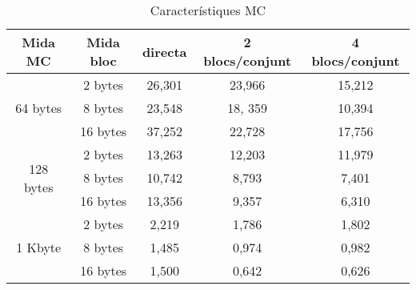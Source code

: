 \documentclass{article}
\begin{document}
\begin{table}[!h]
\centering
\begin{tabular}{ |c|c|c|c|c| }
\hline
Mida MC& Mida bloc& directa& 2 blocs/conjunt& 4 blocs/conjunt \\
\hline
\multirow{3}{4em}{64 bytes} & 2 bytes & 26,301 & 23,966 & 15,212 \\
& 8 bytes & 23,548 & 18, 359 & 10,394 \\
& 16 bytes & 37,252 & 22,728 & 17,756 \\
\hline
\multirow{3}{4em}{128 bytes} & 2 bytes & 13,263 & 12,203 & 11,979 \\
& 8 bytes & 10,742 & 8,793 & 7,401 \\
& 16 bytes & 13,356 & 9,357 & 6,310 \\
\hline
\multirow{3}{4em}{1 Kbyte} & 2 bytes & 2,219 & 1,786 & 1,802 \\
& 8 bytes & 1,485 & 0,974 & 0,982 \\
& 16 bytes & 1,500 & 0,642 & 0,626 \\
\hline
\end{tabular}
\caption{Característiques MC}
\label{tab:mc}
\end{table}
\end{document}
